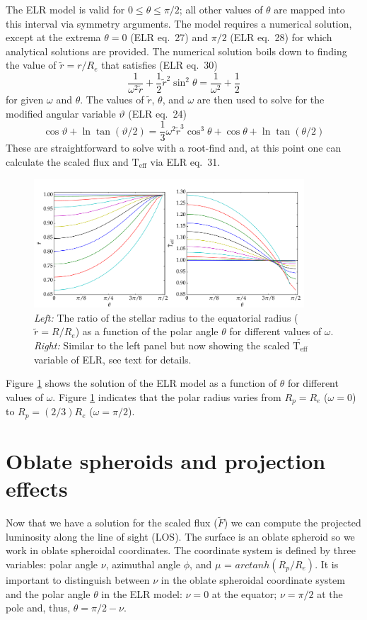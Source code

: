 \documentclass[12pt]{article}
\newcommand{\Teff}{\mathrm{T_{eff}}}
\begin{document}
The ELR model is valid for $0 \leq \theta \leq \pi/2$; all other values of
$\theta$ are mapped into this interval via symmetry arguments. The model
requires a numerical solution, except at the extrema $\theta = 0$ (ELR eq.\ 27)
and $\pi/2$ (ELR eq.\ 28) for which analytical solutions are provided. The
numerical solution boils down to finding the value of $\tilde{r}=r/R_e$ that
satisfies (ELR eq.\ 30)
\begin{equation}
  \frac{1}{\omega^2 \tilde{r}} + \frac{1}{2} \tilde{r}^2 \sin^2 \theta = \frac{1}{\omega^2} + \frac{1}{2}
\end{equation}
for given $\omega$ and $\theta$. The values of $\tilde{r}$, $\theta$, and $\omega$ are then used to solve for the modified angular variable $\vartheta$ (ELR eq.\ 24)
\begin{equation}
  \cos \vartheta + \ln \tan(\vartheta/2) = \frac{1}{3} \omega^2 \tilde{r}^3 \cos^3 \theta + \cos \theta + \ln \tan(\theta/2)
\end{equation}
These are straightforward to solve with a root-find and, at this point one can calculate the scaled flux and $\Teff$ via ELR eq.\ 31.

\begin{figure}
  \includegraphics[width=0.9\textwidth]{../plots/R_and_T.pdf}
  \caption{\emph{Left:} The ratio of the stellar radius to the equatorial radius ($\tilde{r}=R/R_e$) as a function of the polar angle $\theta$ for different values of $\omega$. \emph{Right:} Similar to the left panel but now showing the scaled $\tilde{\Teff}$ variable of ELR, see text for details.\label{fig:ELR}}
\end{figure}

Figure \ref{fig:ELR} shows the solution of the ELR model as a function of
$\theta$ for different values of $\omega$. Figure \ref{fig:ELR} indicates
that the polar radius varies from $R_p = R_e$ ($\omega=0$) to $R_p = (2/3) R_e$
($\omega=\pi/2$).


\section{Oblate spheroids and projection effects}
Now that we have a solution for the scaled flux ($\tilde{F}$) we can
compute the projected luminosity along the line of sight (LOS). The surface is
an oblate spheroid so we work in oblate spheroidal coordinates. The coordinate
system is defined by three variables: polar angle $\nu$, azimuthal angle
$\phi$, and $\mu$ = $arctanh( R_p /R_e )$. It is important to distinguish
between $\nu$ in the oblate spheroidal coordinate system and the polar angle
$\theta$ in the ELR model: $\nu = 0$ at the equator; $\nu = \pi/2$ at the pole
and, thus, $\theta = \pi/2 - \nu$.
\end{document}
